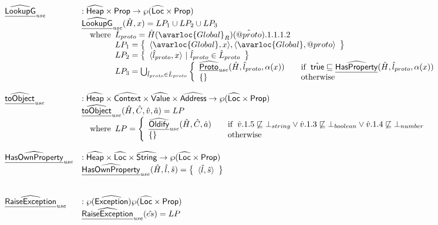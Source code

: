 \[\begin{array}{ll}
\ahf{LookupG}_{\it use} & : \aHeap \times \SF{Prop} \rightarrow \powerset{\aLoc \times \SF{Prop}}\\
& \ahf{LookupG}_{\it use}(\hat{H},x) = LP_1 \cup LP_2 \cup LP_3\\
& \quad\wherec{
  \hat{L}_{proto} = \hat{H}(\avarloc{Global}_R)(\hat{\varprop{proto}}).1.1.1.2\\
  LP_1 = \set{\langle\avarloc{Global},x\rangle, \langle\avarloc{Global},\varprop{proto}\rangle}\\
  LP_2 = \set{\langle\hat{l}_{proto},x\rangle ~|~ \hat{l}_{proto}\in\hat{L}_{proto}}\\
  LP_3 = \bigcup_{\hat{l}_{proto}\in\hat{L}_{proto}}\left\{
    \begin{array}{ll}
      \ahf{Proto}_{\it use}(\hat{H},\hat{l}_{proto},\alpha(x))&\quad\ifc{\atrue \sqsubseteq \ahf{HasProperty}(\hat{H},\hat{l}_{proto},\alpha(x))}\\
      \set{} &\quad\owc
    \end{array}
  \right.\\
}
\\\\
\ahf{toObject}_{\it use} & : \aHeap \times \abs{Context} \times \aValue \times \abs{Address} \rightarrow \powerset{\aLoc \times \SF{Prop}}\\
& \ahf{toObject}_{\it use}(\hat{H}, \hat{C}, \hat{v}, \hat{a}) = LP\\
& \quad\wherec{
  LP =
  \left\{
    \begin{array}{ll}
      \ahf{Oldify}_{\it use}(\hat{H}, \hat{C}, \hat{a})& \quad\ifc{\hat{v}.1.5\not\sqsubseteq\bot_{string}
        \lor \hat{v}.1.3\not\sqsubseteq\bot_{boolean}
        \lor \hat{v}.1.4\not\sqsubseteq\bot_{number}}\\
      \set{} & \quad\owc
    \end{array}
  \right.
}
\\\\
\ahf{HasOwnProperty}_{\it use} & : \aHeap \times \aLoc \times \abs{String} \rightarrow \powerset{\aLoc \times \SF{Prop}}\\
& \ahf{HasOwnProperty}_{\it use}(\hat{H},\hat{l},\hat{s}) = \set{\langle \hat{l},\hat{s}\rangle}\\
\\\\
\ahf{RaiseException}_{\it use} & : \powerset{\abs{Exception}} \powerset{\aLoc \times \SF{Prop}}\\
& \ahf{RaiseException}_{\it use}(\hat{es}) = LP\\

\end{array}\]
